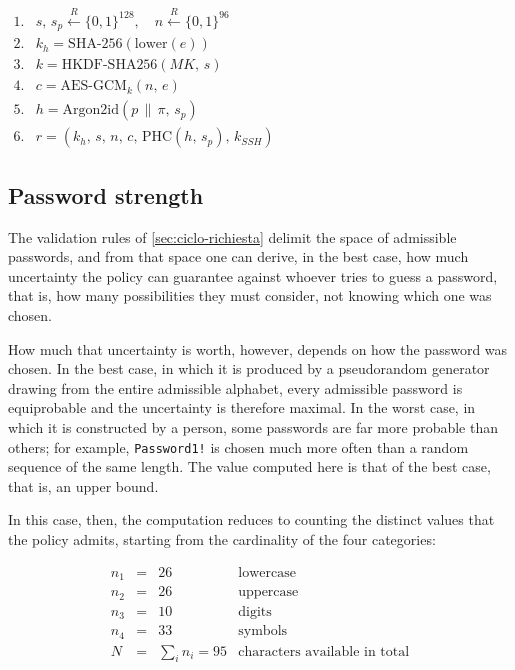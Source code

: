 \begin{schema}
\centering
$\begin{array}{rl}
1. & s,\, s_p \stackrel{R}{\leftarrow} \{0,1\}^{128}, \quad n \stackrel{R}{\leftarrow} \{0,1\}^{96} \\[4pt]
2. & k_h = \mathrm{SHA\mbox{-}256}(\mathrm{lower}(e)) \\[4pt]
3. & k = \mathrm{HKDF\mbox{-}SHA256}(MK,\, s) \\[4pt]
4. & c = \mathrm{AES\mbox{-}GCM}_{k}(n,\, e) \\[4pt]
5. & h = \mathrm{Argon2id}(p \, \| \, \pi,\, s_p) \\[4pt]
6. & r = (k_h,\, s,\, n,\, c,\, \mathrm{PHC}(h,\, s_p),\, k_{SSH})
\end{array}$
\caption{Transformations applied to the credentials before the record is written.}
\label{sch:credenziali}
\end{schema}

\subsection{Password strength}
\label{sec:entropia}

The validation rules of \autoref{sec:ciclo-richiesta} delimit the space of admissible
passwords, and from that space one can derive, in the best case, how much uncertainty the policy can
guarantee against whoever tries to guess a password, that is, how many possibilities they must consider, not
knowing which one was chosen.

How much that uncertainty is worth, however, depends on how the password was chosen. In the best case, in
which it is produced by a pseudorandom generator drawing from the entire admissible alphabet, every
admissible password is equiprobable and the uncertainty
is therefore maximal. In the worst case, in which it is constructed by a person, some passwords are
far more probable than others; for example, \texttt{Password1!} is chosen much more often than
a random sequence of the same length. The value computed here is that of the best case, that is, an
upper bound.

In this case, then, the computation reduces to counting the distinct values that the policy admits, starting
from the cardinality of the four categories:

\[
\begin{array}{rcll}
n_1 & = & 26  & \mbox{lowercase} \\
n_2 & = & 26  & \mbox{uppercase} \\
n_3 & = & 10  & \mbox{digits} \\
n_4 & = & 33  & \mbox{symbols} \\[2pt]
N   & = & \sum_i n_i = 95 & \mbox{characters available in total}
\end{array}
\]

